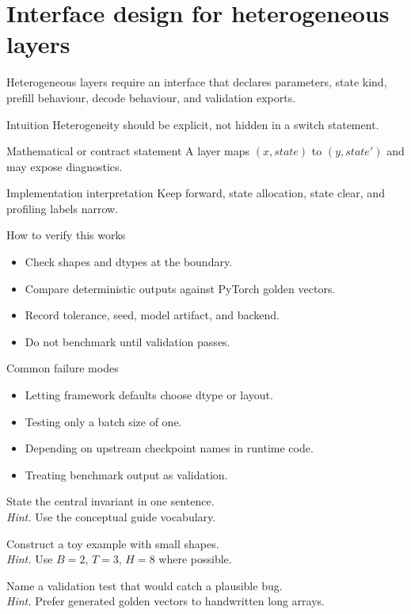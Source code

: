 \chapter{Interface design for heterogeneous layers}
\label{ch:heterogeneous-layers}
Heterogeneous layers require an interface that declares parameters, state kind, prefill behaviour, decode behaviour, and validation exports.



\begin{intuitionbox}{Intuition}
Heterogeneity should be explicit, not hidden in a switch statement.
\end{intuitionbox}

\begin{definitionbox}{Mathematical or contract statement}
A layer maps \((x,state)\) to \((y,state')\) and may expose diagnostics.
\end{definitionbox}

\begin{implementationbox}{Implementation interpretation}
Keep forward, state allocation, state clear, and profiling labels narrow.
\end{implementationbox}

\begin{verificationbox}{How to verify this works}
\begin{itemize}
\item Check shapes and dtypes at the boundary.
\item Compare deterministic outputs against PyTorch golden vectors.
\item Record tolerance, seed, model artifact, and backend.
\item Do not benchmark until validation passes.
\end{itemize}
\end{verificationbox}

\begin{warningbox}{Common failure modes}
\begin{itemize}
\item Letting framework defaults choose dtype or layout.
\item Testing only a batch size of one.
\item Depending on upstream checkpoint names in runtime code.
\item Treating benchmark output as validation.
\end{itemize}
\end{warningbox}

\begin{chapterexercises}
\item State the central invariant in one sentence.\\
\textit{Hint.} Use the conceptual guide vocabulary.
\item Construct a toy example with small shapes.\\
\textit{Hint.} Use $B=2$, $T=3$, $H=8$ where possible.
\item Name a validation test that would catch a plausible bug.\\
\textit{Hint.} Prefer generated golden vectors to handwritten long arrays.
\end{chapterexercises}

